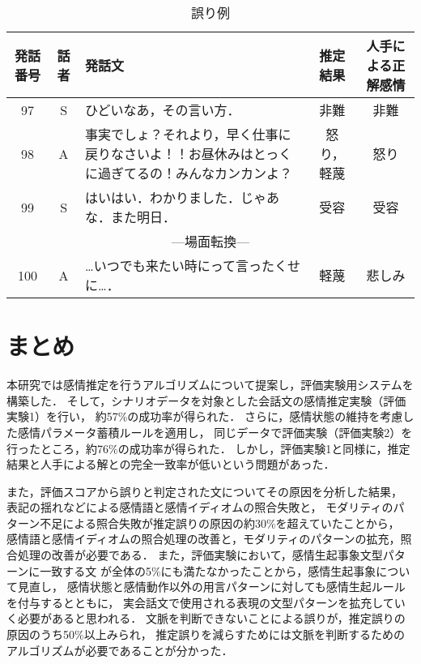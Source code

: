 \documentclass[japanese]{jnlp_1.3c}
\begin{document}
\begin{table}[t]
\begin{center}
\caption{誤り例}
\begin{tabular}{|c|c|p{6.5cm}|c|c|}
\hline
発話番号 & 話者 & 発話文 & 推定結果 & 人手による正解感情 \\ \hline \hline
97	& S &	ひどいなあ，その言い方． & 非難 & 非難 \\ \hline
98	& A &	事実でしょ？それより，早く仕事に戻りなさいよ！！お昼休みはとっくに過ぎてるの！みんなカンカンよ？ & 怒り，軽蔑 & 怒り \\ \hline
99	& S &	はいはい．わかりました．じゃあな．また明日． & 受容 & 受容 \\ \hline
\multicolumn{5}{|c|}{—場面転換—} \\ \hline
100	& A & …いつでも来たい時にって言ったくせに…．& 軽蔑 & 悲しみ \\ \hline
\end{tabular}
\label{tb:error_param}
\end{center}
\end{table}


\section{まとめ}

本研究では感情推定を行うアルゴリズムについて提案し，評価実験用システムを構築した．
そして，シナリオデータを対象とした会話文の感情推定実験（評価実験1）を行い，
約57\%の成功率が得られた．
さらに，感情状態の維持を考慮した感情パラメータ蓄積ルールを適用し，
同じデータで評価実験（評価実験2）を行ったところ，約76\%の成功率が得られた．
しかし，評価実験1と同様に，推定結果と人手による解との完全一致率が低いという問題があった．

また，評価スコアから誤りと判定された文についてその原因を分析した結果，
表記の揺れなどによる感情語と感情イディオムの照合失敗と，
モダリティのパターン不足による照合失敗が推定誤りの原因の約30\%を超えていたことから，
感情語と感情イディオムの照合処理の改善と，モダリティのパターンの拡充，照合処理の改善が必要である．
また，評価実験において，感情生起事象文型パターンに一致する文
が全体の5\%にも満たなかったことから，感情生起事象について見直し，
感情状態と感情動作以外の用言パターンに対しても感情生起ルールを付与するとともに，
実会話文で使用される表現の文型パターンを拡充していく必要があると思われる．
文脈を判断できないことによる誤りが，推定誤りの原因のうち50\%以上みられ，
推定誤りを減らすためには文脈を判断するためのアルゴリズムが必要であることが分かった．
\end{document}
